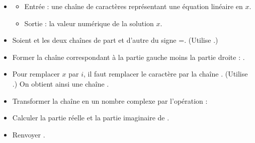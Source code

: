 \documentclass[11pt,class=report,crop=false]{standalone}
\begin{document}
\begin{activite}
\bigskip


  \begin{algorithme}
  \sauteligne 
  \begin{itemize}
    \item 
    \begin{itemize}
     \item Entrée : une chaîne de caractères représentant une équation linéaire en $x$.
     \item Sortie : la valeur numérique de la solution $x$.
     \end{itemize}  
     
   \item Soient  et  les deux chaînes de part et d'autre du signe \og{}=\fg{}. (Utilise
   .)
   
   
   \item Former la chaîne correspondant à la partie gauche moins la partie droite :  
   .
   
   \item Pour remplacer $x$ par $i$, il faut remplacer le caractère  par la chaîne . (Utilise .) On obtient ainsi une chaîne .
  
  	
  \item Transformer la chaîne en un nombre complexe par l'opération :
  
  
  \item Calculer la partie réelle  et la partie imaginaire  de .
  
  \item Renvoyer .
   
 \end{itemize}  
 \end{algorithme}


\end{activite}

\end{document}
